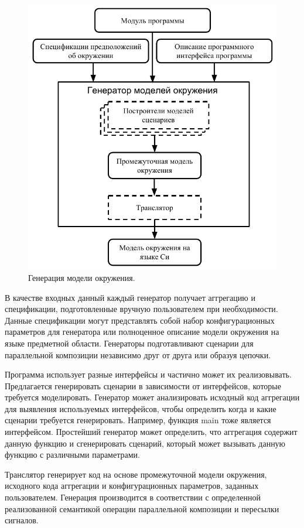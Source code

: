 \documentclass[%
candidate,     %
href,        %
colorlinks,  %
]{disser}
\begin{document}
\begin{figure}
\centering
\includegraphics[scale=1.2]{generators}
\caption{Генерация модели окружения.}
\label{figure:em}
\end{figure}

В качестве входных данный каждый генератор получает аггрегацию и спецификации, подготовленные вручную пользователем при необходимости.
Данные спецификации могут представлять собой набор конфигурационных параметров для генератора или полноценное описание модели окружения на языке предметной области.
Генераторы подготавливают сценарии для параллельной композиции независимо друг от друга или образуя цепочки.

Программа использует разные интерфейсы и частично может их реализовывать.
Предлагается генерировать сценарии в зависимости от интерфейсов, которые требуется моделировать.
Генератор может анализировать исходный код аггрегации для выявления используемых интерфейсов, чтобы определить когда и какие сценарии требуется генерировать.
Например, функция main тоже является интерфейсом.
Простейший генератор может определить, что аггрегация содержит данную функцию и сгенерировать сценарий, который может вызывать данную функцию с различными параметрами.

Транслятор генерирует код на основе промежуточной модели окружения, исходного кода аггрегации и конфигурационных параметров, заданных пользователем.
Генерация производится в соответствии с определенной реализованной семантикой операции параллельной композиции и пересылки сигналов.
\end{document}
